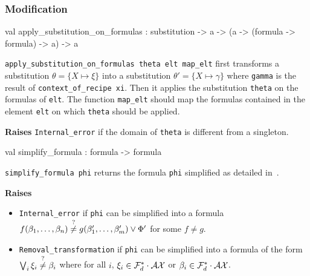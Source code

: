 \subsubsection{Modification}




\label{val:Recipe.apply-underscoresubstitution-underscoreon-underscoreformulas}\begin{ocamldoccode}
val apply_substitution_on_formulas :
  substitution ->
  {\textquotesingle}a -> ({\textquotesingle}a -> (formula -> formula) -> {\textquotesingle}a) -> {\textquotesingle}a
\end{ocamldoccode}
\begin{ocamldocdescription}
{\tt{apply\_substitution\_on\_formulas theta elt map\_elt}} first transforms a substitution $\theta = \{X \mapsto \xi\}$
    into a substitution $\theta' = \{X \mapsto \gamma\}$  where {\tt{gamma}} is the result of {\tt{context\_of\_recipe xi}}.
    Then it applies the substitution {\tt{theta{\textquotesingle}}} on the formulas of {\tt{elt}}. The function
    {\tt{map\_elt}} should map the formulas contained in the element {\tt{elt}} on which {\tt{theta{\textquotesingle}}} should be applied.

{\bf Raises} {\tt{Internal\_error}} if the domain of {\tt{theta}} is different from a singleton.


\end{ocamldocdescription}




\label{val:Recipe.simplify-underscoreformula}\begin{ocamldoccode}
val simplify_formula : formula -> formula
\end{ocamldoccode}
\begin{ocamldocdescription}
{\tt{simplify\_formula phi}} returns the formula {\tt{phi}} simplified as detailed in~. 

{\bf Raises} \begin{itemize}
\item {\tt{Internal\_error}} if {\tt{phi}} can be simplified into a formula $f(\beta_1, \ldots, \beta_n) \stackrel{?}{\neq} g(\beta'_1, \ldots, \beta'_m) \vee \Phi'$ for some $f \neq g$. 
\item {\tt{Removal\_transformation}} if {\tt{phi}} can be simplified into a formula of the form $\bigvee_i \xi_i \stackrel{?}{\neq} \beta_i$ where for all $i$, $\xi_i \in \mathcal{F}_d^*\cdot \mathcal{AX}$ or $\beta_i \in \mathcal{F}_d^*\cdot \mathcal{AX}$. 
\end{itemize}



\end{ocamldocdescription}




